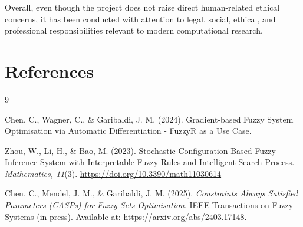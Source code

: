 \documentclass[a4paper,12pt,oneside]{article}
\begin{document}
Overall, even though the project does not raise direct human-related ethical concerns, it has been conducted with attention to legal, social, ethical, and professional responsibilities relevant to modern computational research.


\newpage
\section{References}
\begin{thebibliography}{9}


Chen, C., Wagner, C., \& Garibaldi, J. M. (2024). 
Gradient-based Fuzzy System Optimisation via Automatic Differentiation - FuzzyR as a Use Case.

Zhou, W., Li, H., \& Bao, M. (2023). 
Stochastic Configuration Based Fuzzy Inference System with Interpretable Fuzzy Rules and Intelligent Search Process. 
\textit{Mathematics, 11}(3). 
\href{https://doi.org/10.3390/math11030614}{https://doi.org/10.3390/math11030614}

Chen, C., Mendel, J. M., \& Garibaldi, J. M. (2025).
\textit{Constraints Always Satisfied Parameters (CASPs) for Fuzzy Sets Optimisation}. 
IEEE Transactions on Fuzzy Systems (in press).
Available at: \href{https://arxiv.org/abs/2403.17148}{https://arxiv.org/abs/2403.17148}.

\end{thebibliography}
\end{document}

